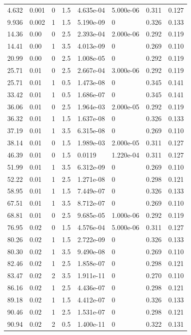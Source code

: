 \documentclass[preview]{standalone}
\begin{document}
{{\begin{tabular}{L{1.2cm}C{1.2cm} C{0.3cm}C{0.5cm} C{1.4cm}C{1.4cm} C{1.4cm}C{1.4cm}}
  4.632  &  0.001  & 0     & 1.5 &  4.635e-04  & 5.000e-06  & 0.311 &  0.127   \\ 
  9.936  &  0.002  & 1     & 1.5 &  5.190e-09  & 0  & 0.326 &  0.133   \\ 
  14.36  &  0.00  & 0     & 2.5 &  2.393e-04  & 2.000e-06  & 0.292 &  0.119   \\ 
  14.41  &  0.00  & 1     & 3.5 &  4.013e-09  & 0  & 0.269 &  0.110   \\ 
  20.99  &  0.00  & 0     & 2.5 &  1.008e-05  & 0  & 0.292 &  0.119   \\ 
  25.71  &  0.01  & 0     & 2.5 &  2.667e-04  & 3.000e-06  & 0.292 &  0.119   \\ 
  25.71  &  0.01  & 1     & 0.5 &  1.473e-08  & 0  & 0.345 &  0.141   \\ 
  33.42  &  0.01  & 1     & 0.5 &  1.686e-07  & 0  & 0.345 &  0.141   \\ 
  36.06  &  0.01  & 0     & 2.5 &  1.964e-03  & 2.000e-05  & 0.292 &  0.119   \\ 
  36.32  &  0.01  & 1     & 1.5 &  1.637e-08  & 0  & 0.326 &  0.133   \\ 
  37.19  &  0.01  & 1     & 3.5 &  6.315e-08  & 0  & 0.269 &  0.110   \\ 
  38.14  &  0.01  & 0     & 1.5 &  1.989e-03  & 2.000e-05  & 0.311 &  0.127   \\ 
  46.39  &  0.01  & 0     & 1.5 &  0.0119  & 1.220e-04  & 0.311 &  0.127   \\ 
  51.99  &  0.01  & 1     & 3.5 &  6.312e-09  & 0  & 0.269 &  0.110   \\ 
  52.22  &  0.01  & 1     & 2.5 &  1.271e-08  & 0  & 0.298 &  0.121   \\ 
  58.95  &  0.01  & 1     & 1.5 &  7.449e-07  & 0  & 0.326 &  0.133   \\ 
  67.51  &  0.01  & 1     & 3.5 &  8.712e-07  & 0  & 0.269 &  0.110   \\ 
  68.81  &  0.01  & 0     & 2.5 &  9.685e-05  & 1.000e-06  & 0.292 &  0.119   \\ 
  76.95  &  0.02  & 0     & 1.5 &  4.576e-04  & 5.000e-06  & 0.311 &  0.127   \\ 
  80.26  &  0.02  & 1     & 1.5 &  2.722e-09  & 0  & 0.326 &  0.133   \\ 
  80.30  &  0.02  & 1     & 3.5 &  9.490e-08  & 0  & 0.269 &  0.110   \\ 
  82.46  &  0.02  & 1     & 2.5 &  1.858e-07  & 0  & 0.298 &  0.121   \\ 
  83.47  &  0.02  & 2     & 3.5 &  1.911e-11  & 0  & 0.270 &  0.110   \\ 
  86.16  &  0.02  & 1     & 2.5 &  4.436e-07  & 0  & 0.298 &  0.121   \\ 
  89.18  &  0.02  & 1     & 1.5 &  4.412e-07  & 0  & 0.326 &  0.133   \\ 
  90.46  &  0.02  & 1     & 2.5 &  1.531e-07  & 0  & 0.298 &  0.121   \\ 
  90.94  &  0.02  & 2     & 0.5 &  1.400e-11  & 0  & 0.322 &  0.131   \\ 
\hline 
\end{tabular} 

}}
\end{document}
